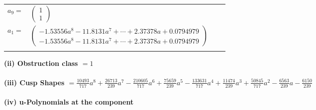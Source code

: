 \documentclass[1p]{elsarticle_modified}
\theoremstyle{definition}
\begin{document}
\begin{tabular}{m{7pt} m{180pt} m{7pt} m{180pt} }
\flushright $a_{9}=$&$\begin{pmatrix}1\\1\end{pmatrix}$ \\
\flushright $a_{1}=$&$\begin{pmatrix}-1.53556 a^{8}-11.8131 a^{7}+\cdots+2.37378 a+0.0794979\\-1.53556 a^{8}-11.8131 a^{7}+\cdots+2.37378 a+0.0794979\end{pmatrix}$\\&\end{tabular}
\flushleft \textbf{(ii) Obstruction class $= 1$}\\~\\
\flushleft \textbf{(iii) Cusp Shapes $= \frac{10493}{717} a^8+\frac{26713}{239} a^7-\frac{210605}{717} a^6+\frac{75659}{239} a^5-\frac{133631}{717} a^4+\frac{11474}{239} a^3+\frac{50845}{717} a^2-\frac{6563}{239} a-\frac{6150}{239}$}\\~\\
\newpage\renewcommand{\arraystretch}{1}
\flushleft \textbf{(iv) u-Polynomials at the component}\newline \\
\end{document}
